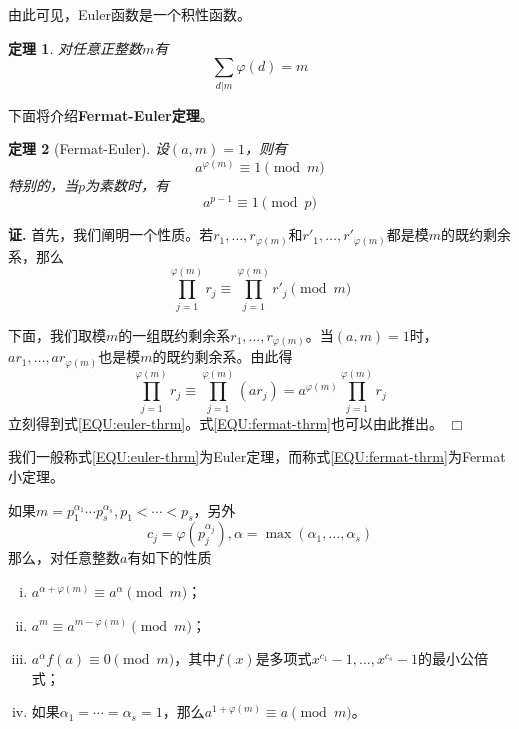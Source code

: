 \documentclass{ctexrep}
\newcommand{\bbold}[1]{\textbf{#1}}
\newtheorem{thrm}{定理}[section]
\renewenvironment{proof}[1][证]{\noindent \textbf{#1.} }{\hfill$\Box$}
\begin{document}
由此可见，Euler函数是一个积性函数。

\begin{thrm}
对任意正整数$m$有
\begin{displaymath}
\sum_{d|m}\varphi(d)=m
\end{displaymath}
\end{thrm}

下面将介绍\bbold{Fermat-Euler定理}。

\begin{thrm}[Fermat-Euler]
设$(a,m)=1$，则有
\begin{equation}\label{EQU:euler-thrm}
a^{\varphi(m)}\equiv 1\pmod{m}
\end{equation}
特别的，当$p$为素数时，有
\begin{equation}\label{EQU:fermat-thrm}
a^{p-1}\equiv 1\pmod{p}
\end{equation}
\end{thrm}
\begin{proof}
首先，我们阐明一个性质。若$r_1,\dotsc,r_{\varphi(m)}$和$r'_1,\dotsc,r'_{\varphi(m)}$都是模$m$的既约剩余系，那么
\begin{displaymath}
\prod^{\varphi(m)}_{j=1}r_j\equiv \prod^{\varphi(m)}_{j=1}r'_j\pmod{m}
\end{displaymath}

下面，我们取模$m$的一组既约剩余系$r_1,\dotsc,r_{\varphi(m)}$。当$(a,m)=1$时，$ar_1,\dotsc,ar_{\varphi(m)}$也是模$m$的既约剩余系。由此得
\begin{displaymath}
\prod^{\varphi(m)}_{j=1}r_j\equiv \prod^{\varphi(m)}_{j=1}(ar_j)=a^{\varphi(m)}\prod^{\varphi(m)}_{j=1}r_j
\end{displaymath}
立刻得到式\ref{EQU:euler-thrm}。式\ref{EQU:fermat-thrm}也可以由此推出。
\end{proof}

我们一般称式\ref{EQU:euler-thrm}为Euler定理，而称式\ref{EQU:fermat-thrm}为Fermat小定理。

如果$m=p_1^{\alpha_1}\dotsm p_s^{\alpha_s},p_1<\dotsb<p_s$，另外
\begin{displaymath}
c_j=\varphi(p_j^{\alpha_j}),\alpha=\max(\alpha_1,\dotsc,\alpha_s)
\end{displaymath}
那么，对任意整数$a$有如下的性质
\begin{enumerate}[(i)]
\item $a^{\alpha+\varphi(m)}\equiv a^\alpha\pmod{m}$；
\item $a^m\equiv a^{m-\varphi(m)}\pmod{m}$；
\item $a^\alpha f(a)\equiv 0\pmod{m}$，其中$f(x)$是多项式$x^{c_1}-1,\dotsc,x^{c_s}-1$的最小公倍式；
\item 如果$\alpha_1=\dotsb=\alpha_s=1$，那么$a^{1+\varphi(m)}\equiv a\pmod{m}$。
\end{enumerate}
\end{document}
